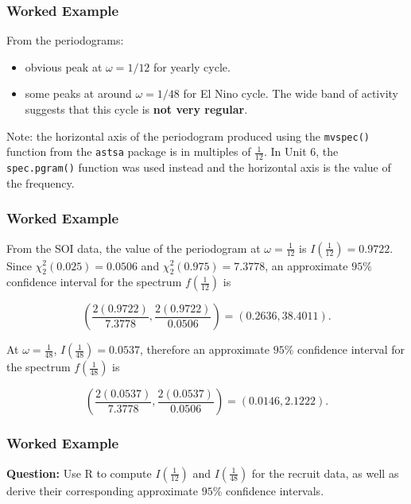 \documentclass[%
xcolor=pdftex]{beamer}
\begin{document}
\begin{frame} [fragile]
\frametitle{Worked Example}

From the periodograms:

\begin{itemize}
\item obvious peak at $\omega = 1/12$ for yearly cycle.
\item some peaks at around $\omega = 1/48$ for El Nino cycle. The wide band of activity suggests that this cycle is \textbf{not very regular}.
\end{itemize}

Note: the horizontal axis of the periodogram produced using the \verb=mvspec()= function from the \verb=astsa= package is in multiples of $\frac{1}{12}$. In Unit 6, the \verb=spec.pgram()= function was used instead and the horizontal axis is the value of the frequency.

\end{frame}

\begin{frame}
\frametitle{Worked Example}

From the SOI data, the value of the periodogram at $\omega = \frac{1}{12}$ is $I(\frac{1}{12}) = 0.9722$. Since $\chi_2^2(0.025) = 0.0506$ and $\chi_2^2(0.975) = 7.3778$, an approximate $95\%$ confidence interval for the spectrum $f(\frac{1}{12})$ is

$$
\left(\frac{2(0.9722)}{7.3778}, \frac{2(0.9722)}{0.0506}\right) = (0.2636, 38.4011).
$$

At $\omega = \frac{1}{48}$, $I(\frac{1}{48}) = 0.0537$, therefore an approximate $95\%$ confidence interval for the spectrum $f(\frac{1}{48})$ is

$$
\left(\frac{2(0.0537)}{7.3778}, \frac{2(0.0537)}{0.0506}\right) = (0.0146, 2.1222).
$$
\end{frame}

\begin{frame}
\frametitle{Worked Example}

\textbf{Question:} Use R to compute $I(\frac{1}{12})$ and $I(\frac{1}{48})$ for the recruit data, as well as derive their corresponding approximate $95\%$ confidence intervals.

\vspace{50mm}

\end{frame}
\end{document}
